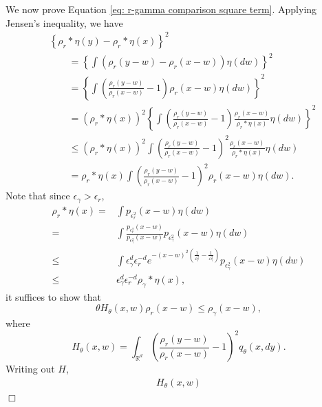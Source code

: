 \documentclass[12pt]{article}
\newenvironment {proof}{{\noindent\bf Proof }}{\hfill $\Box$ \medskip}
\begin{document}
\begin{proof}
We now prove Equation \eqref{eq: r-gamma comparison square term}. Applying Jensen's inequality, we have
\begin{align}
&\left\{
            \rho_r * \eta(y)
            -
            \rho_r * \eta(x)
\right\}^2  \\
&\qquad
=
\left\{
\int
    \left(
        \rho_r(y-w)
        -
        \rho_r(x-w)
    \right)
\eta(dw)
\right\}^2  \\
&\qquad
=
\left\{
\int
    \left(
        \frac{\rho_r(y-w)}{\rho_r(x-w)}
        -
        1
    \right)
    \rho_r(x-w)
\eta(dw)
\right\}^2  \\
&\qquad
=
\left(\rho_r * \eta(x)\right)^2 \left\{
\int
    \left(
        \frac{\rho_r(y-w)}{\rho_r(x-w)}
        -
        1
    \right)
    \frac{\rho_r(x-w)}{\rho_r * \eta(x)}
\eta(dw)
\right\}^2  \\
&\qquad
\le
\left(\rho_r * \eta(x)\right)^2 
\int
    \left(
        \frac{\rho_r(y-w)}{\rho_r(x-w)}
        -
        1
    \right)^2
    \frac{\rho_r(x-w)}{\rho_r * \eta(x)}
\eta(dw) \\
&\qquad
=
\rho_r * \eta(x)
\int
    \left(
        \frac{\rho_r(y-w)}{\rho_r(x-w)}
        -
        1
    \right)^2
    \rho_r(x-w)
\eta(dw).
\end{align}
Note that since $\epsilon_{\gamma}>\epsilon_{r}$,
\begin{equation}
\begin{aligned}
 \rho_r * \eta(x)=& \int p_{\epsilon^2_r}(x-w) \eta(dw)\\
                 =&  \int \frac{p_{\epsilon^2_r}(x-w)}{p_{\epsilon^2_\gamma}(x-w)}
                  p_{\epsilon^2_\gamma}(x-w) \eta(dw)\\
            \leq & \int \epsilon_\gamma^d \epsilon_r^{-d}
                   e^{-(x-w)^2(\frac{1}{\varepsilon^2_r}-\frac{1}{\varepsilon^2_\gamma})}
                   p_{\epsilon^2_\gamma}(x-w) \eta(dw)\\
            \leq & \epsilon_\gamma^d \epsilon_r^{-d}\rho_\gamma * \eta(x),
\end{aligned}
\end{equation}
it suffices to show that 
\begin{equation}
 \theta H_{\theta}(x,w)\rho_r(x-w)\leq \rho_{\gamma}(x-w),
\end{equation}
where
$$H_{\theta}(x,w)=\int_{\mathbb{R}^d}
    \left(
        \frac{\rho_r(y-w)}{\rho_r(x-w)}
        -
        1
    \right)^2
q_{\theta}(x,dy).$$
Writing out $H$,
\begin{align}
H_\theta(x, w)

\end{align}
\end{proof}
\end{document}
